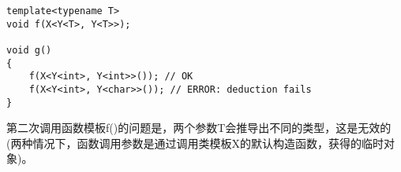 \begin{lstlisting}[style=styleCXX]
template<typename T>
void f(X<Y<T>, Y<T>>);

void g()
{
	f(X<Y<int>, Y<int>>()); // OK
	f(X<Y<int>, Y<char>>()); // ERROR: deduction fails
}
\end{lstlisting}

第二次调用函数模板f()的问题是，两个参数T会推导出不同的类型，这是无效的(两种情况下，函数调用参数是通过调用类模板X的默认构造函数，获得的临时对象)。
































